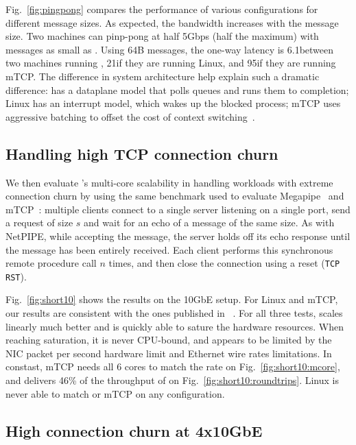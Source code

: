 \edb Fig.~\ref{fig:pingpong} compares the performance of various
configurations for different message sizes.  As expected, the
bandwidth increases with the message size. Two \ix machines can
pinp-pong at half 5Gbps (half the maximum) with messages as small as
.  Using 64B messages, the one-way latency is 6.1\microsecond between two machines running \ix, 21\microsecond if
they are running Linux, and 95\microsecond if they are running mTCP.
The difference in system architecture help explain such a dramatic
difference: \ix has a dataplane model that polls queues and runs them
to completion; Linux has an interrupt model, which wakes up the
blocked process; mTCP uses aggressive batching to offset the cost of context switching~\cite{jeong2014mtcp}.

\subsection{Handling high TCP connection churn}
\label{sec:eval:short}


We then evaluate \ix's multi-core scalability in handling workloads
with extreme connection churn by using the same benchmark used to evaluate
Megapipe~\cite{han2012megapipe} and mTCP~\cite{jeong2014mtcp}:
multiple clients connect to a single server listening on a single
port, send a request of size $s$ and wait for an echo of a message of
the same size.  As with NetPIPE, while accepting the message, the server holds off its
echo response until the message has been entirely received.
Each client performs this synchronous remote procedure
call $n$ times, and then close the connection using a reset
(\texttt{TCP RST}).



Fig.~\ref{fig:short10} shows the results on the 10GbE setup.  For
Linux and mTCP, our results are consistent with the ones published in
~\cite{jeong2014mtcp}.  For all three tests, \ix scales linearly much better
and is quickly able to sature the hardware resources.  When reaching
saturation, it is never CPU-bound, and appears to be limited by the
NIC packet per second hardware limit and Ethernet wire rates
limitations.  In constast, mTCP needs all 6 cores to match the rate on
Fig.~\ref{fig:short10:mcore}, and delivers 46\% of the throughput of
\ix on Fig.~\ref{fig:short10:roundtrips}.  Linux is never able to
match \ix or mTCP on any configuration.


\subsection{High connection churn at 4x10GbE}
\label{sec:eval:short40}

